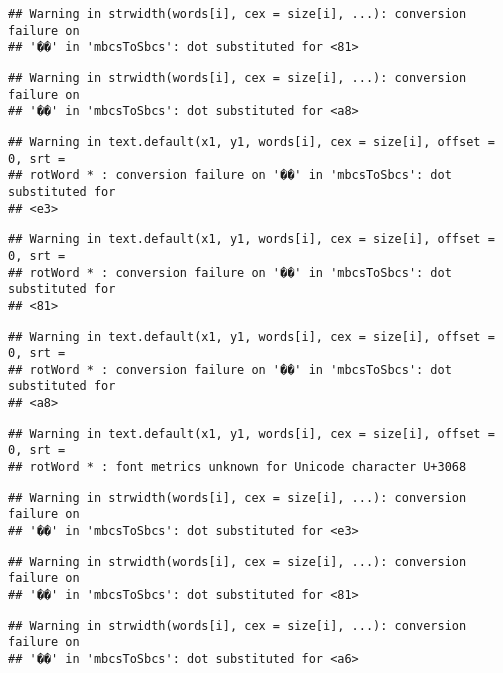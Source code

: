 \documentclass[]{article}
\begin{document}
\begin{verbatim}
## Warning in strwidth(words[i], cex = size[i], ...): conversion failure on
## '��' in 'mbcsToSbcs': dot substituted for <81>
\end{verbatim}

\begin{verbatim}
## Warning in strwidth(words[i], cex = size[i], ...): conversion failure on
## '��' in 'mbcsToSbcs': dot substituted for <a8>
\end{verbatim}

\begin{verbatim}
## Warning in text.default(x1, y1, words[i], cex = size[i], offset = 0, srt =
## rotWord * : conversion failure on '��' in 'mbcsToSbcs': dot substituted for
## <e3>
\end{verbatim}

\begin{verbatim}
## Warning in text.default(x1, y1, words[i], cex = size[i], offset = 0, srt =
## rotWord * : conversion failure on '��' in 'mbcsToSbcs': dot substituted for
## <81>
\end{verbatim}

\begin{verbatim}
## Warning in text.default(x1, y1, words[i], cex = size[i], offset = 0, srt =
## rotWord * : conversion failure on '��' in 'mbcsToSbcs': dot substituted for
## <a8>
\end{verbatim}

\begin{verbatim}
## Warning in text.default(x1, y1, words[i], cex = size[i], offset = 0, srt =
## rotWord * : font metrics unknown for Unicode character U+3068
\end{verbatim}

\begin{verbatim}
## Warning in strwidth(words[i], cex = size[i], ...): conversion failure on
## '��' in 'mbcsToSbcs': dot substituted for <e3>
\end{verbatim}

\begin{verbatim}
## Warning in strwidth(words[i], cex = size[i], ...): conversion failure on
## '��' in 'mbcsToSbcs': dot substituted for <81>
\end{verbatim}

\begin{verbatim}
## Warning in strwidth(words[i], cex = size[i], ...): conversion failure on
## '��' in 'mbcsToSbcs': dot substituted for <a6>
\end{verbatim}
\end{document}
